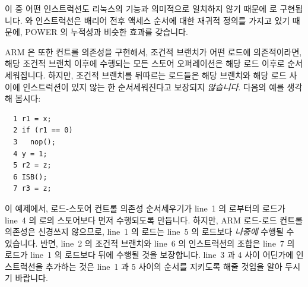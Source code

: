 이 중 어떤 인스트럭션도 리눅스의  기능과 의미적으로 일치하지 않기
때문에  로 구현됩니다.
 와  인스트럭션은 배리어 전후 액세스 순서에 대한 재귀적 정의를
가지고 있기 때문에, POWER 의 누적성과 비슷한 효과를 갖습니다.

ARM 은 또한 컨트롤 의존성을 구현해서, 조건적 브랜치가 어떤 로드에 의존적이라면,
해당 조건적 브랜치 이후에 수행되는 모든 스토어 오퍼레이션은 해당 로드 이후로
순서세워집니다.
하지만, 조건적 브랜치를 뒤따르는 로드들은 해당 브랜치와 해당 로드 사이에
 인스트럭션이 있지 않는 한 순서세워진다고 보장되지 \emph{않습니다}.
다음의 예를 생각해 봅시다:

\vspace{5pt}
\begin{minipage}[t]{\columnwidth}
\small
\begin{verbatim}
  1 r1 = x;
  2 if (r1 == 0)
  3   nop();
  4 y = 1;
  5 r2 = z;
  6 ISB();
  7 r3 = z;
\end{verbatim}
\end{minipage}
\vspace{5pt}

이 예제에서, 로드-스토어 컨트롤 의존성 순서세우기가 line~1 의  로부터의
로드가 line~4 의  로의 스토어보다 먼저 수행되도록 만듭니다.
하지만, ARM 로드-로드 컨트롤 의존성은 신경쓰지 않으므로, line~1 의 로드는
line~5 의 로드보다 \emph{나중에} 수행될 수 있습니다.
반면, line~2 의 조건적 브랜치와 line~6 의  인스트럭션의 조합은 line~7
의 로드가 line~1 의 로드보다 뒤에 수행될 것을 보장합니다.
line~3 과 4 사이 어딘가에  인스트럭션을 추가하는 것은 line~1 과 5
사이의 순서를 지키도록 해줄 것임을 알아 두시기 바랍니다.

